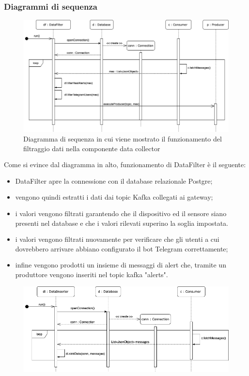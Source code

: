 		\begin{landscape}
		\subsubsection{Diagrammi di sequenza}%
			\begin{figure}[H]
				\centering
				\includegraphics[scale=0.550]{res/images/DATACOLLECTOR/DataFilter.ThreadsKafkaDataCollector.png}
				\caption{Diagramma di sequenza in cui viene mostrato il funzionamento del filtraggio dati nella componente data collector}
				\label{Diagramma 7}
			\end{figure}
			Come si evince dal diagramma in alto, funzionamento di DataFilter è il seguente:
			\begin{itemize}
				\item DataFilter apre la connessione con il database relazionale Postgre;
				\item vengono quindi estratti i dati dai topic Kafka collegati ai gateway;
				\item i valori vengono filtrati garantendo che il dispositivo ed il sensore siano presenti nel database e che i valori rilevati superino la soglia impostata.
				\item i valori vengono filtrati nuovamente per verificare che gli utenti a cui dovrebbero arrivare abbiano configurato il bot Telegram correttamente;
				\item infine vengono prodotti un insieme di messaggi di alert che, tramite un produttore vengono inseriti nel topic kafka "alerts". 
			\end{itemize}
			\begin{figure}[H]
				\centering
				\includegraphics[scale=0.550]{res/images/DATACOLLECTOR/DataInserter.ThreadsKafkaDataCollector.png}

\end{figure}
\end{landscape}
